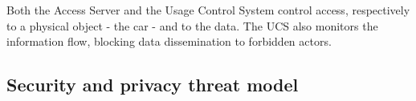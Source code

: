  Both the Access Server and the Usage Control System control access, respectively to a physical object - the car - and to the data. The UCS also monitors the information flow, blocking data dissemination to forbidden actors.

\subsection{Security and privacy threat model}
\label{ss_priv_threats}

